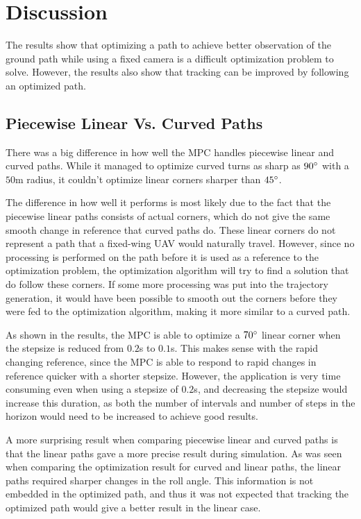 \chapter{Discussion}

The results show that optimizing a path to achieve better observation of the ground path while using a fixed camera is a difficult optimization problem to solve. However, the results also show that tracking can be improved by following an optimized path.

\section{Piecewise Linear Vs. Curved Paths}

There was a big difference in how well the MPC handles piecewise linear and curved paths. While it managed to optimize curved turns as sharp as $90\degree$ with a $50$m radius, it couldn't optimize linear corners sharper than $45\degree$.

The difference in how well it performs is most likely due to the fact that the piecewise linear paths consists of actual corners, which do not give the same smooth change in reference that curved paths do. These linear corners do not represent a path that a fixed-wing UAV would naturally travel. However, since no processing is performed on the path before it is used as a reference to the optimization problem, the optimization algorithm will try to find a solution that do follow these corners. If some more processing was put into the trajectory generation, it would have been possible to smooth out the corners before they were fed to the optimization algorithm, making it more similar to a curved path.

As shown in the results, the MPC is able to optimize a $70\degree$ linear corner when the stepsize is reduced from $0.2$s to $0.1$s. This makes sense with the rapid changing reference, since the MPC is able to respond to rapid changes in reference quicker with a shorter stepsize. However, the application is very time consuming even when using a stepsize of $0.2$s, and decreasing the stepsize would increase this duration, as both the number of intervals and number of steps in the horizon would need to be increased to achieve good results.

A more surprising result when comparing piecewise linear and curved paths is that the linear paths gave a more precise result during simulation. As was seen when comparing the optimization result for curved and linear paths, the linear paths required sharper changes in the roll angle. This information is not embedded in the optimized path, and thus it was not expected that tracking the optimized path would give a better result in the linear case.


